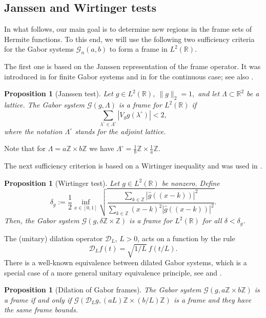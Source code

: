 \documentclass[11pt]{amsart}
\numberwithin{equation}{section}
\newtheorem{proposition}[theorem]{Proposition}
\newcommand{\R}{{\mathbb R}}
\newcommand{\Z}{{\mathbb Z}}
\newcommand{\G}{\mathcal{G}}
\begin{document}
\subsection{Janssen and Wirtinger tests}

In what follows, our main goal is to determine new regions in the frame sets of Hermite functions. To this end, we will use the following two sufficiency criteria for the Gabor systems $\mathcal{G}_n(a,b)$ to form a frame in $L^2(\R)$.

The first one is based on the Janssen representation of the frame operator. It was introduced in \cite{Tsc00_Master} for finite Gabor systems and in \cite{Wie13_PhD} for the continuous case; see also \cite{MR4887696}.
\begin{proposition}[Janssen test]\label{pro:Janssen} Let $g\in L^2(\mathbb R)$, $\|g\|_2=1,$ and let $\Lambda \subset \R^2$ be a lattice.
    The Gabor system $\G(g,\Lambda)$ is a frame for $L^2(\R)$ if
    \begin{equation}
        \sum_{\lambda^\circ \in \Lambda^\circ} |V_g g(\lambda^\circ)| < 2,
    \end{equation}
    where the notation $\Lambda^\circ$ stands for the adjoint lattice.
\end{proposition}
Note that for $\Lambda=a \Z \times b \Z$ we have $\Lambda^\circ = \frac{1}{b} \Z \times \frac{1}{a} \Z$.

The next sufficiency criterion is based on a Wirtinger inequality and was used in \cite{GosSle23, MR3707488, SunZho03}.
\begin{proposition}[Wirtinger test]\label{pro:Wirtinger}
Let $g\in L^2(\mathbb R)$ be nonzero. Define
\begin{equation}\label{eq:Wirtinger}
    \delta_g:= \frac{1}{2} \inf_{x\in[0,1]}
    \sqrt{\frac{\displaystyle\sum_{k\in\mathbb Z}|\widehat g((x-k))|^2}{\displaystyle\sum_{k\in\mathbb Z}(x-k)^2|\widehat g((x-k))|^2}}.
\end{equation}
Then, the Gabor system $\mathcal{G}(g,\delta \mathbb Z\times \mathbb Z)$ is a frame for $L^2(\mathbb R)$ for all $\delta < \delta_g$.
\end{proposition}

The (unitary) dilation operator $\mathcal{D}_L$, $L > 0$, acts on a function by the rule
\begin{equation}
    \mathcal{D}_L f(t) = \sqrt{1/L} \ f(t/L).
\end{equation}
There is a well-known equivalence between dilated Gabor systems, which is a special case of a more general unitary equivalence principle, see \cite{Fau25_SampTA, Gos15} and \cite[Chap.~9.4]{Gro01}.
\begin{proposition}[Dilation of Gabor frames]\label{pro:dilation}
    The Gabor system $\G(g, a \Z \times b \Z)$ is a frame if and only if $\G(\mathcal{D}_L g, (a L) \Z \times (b/L) \Z)$ is a frame and they have the same frame bounds.
\end{proposition}
\end{document}
